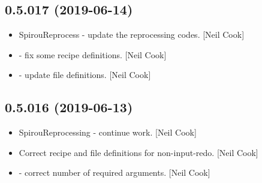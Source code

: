 \documentclass[a4paper,10pt,english]{report}
\begin{document}
\subsection{0.5.017 (2019-06-14)}
\label{\detokenize{misc/changelog:id119}}\begin{itemize}
\item {} 
SpirouReprocess - update the reprocessing codes. {[}Neil Cook{]}

\item {} 
 - fix some recipe definitions. {[}Neil Cook{]}

\item {} 
 - update file definitions. {[}Neil Cook{]}

\end{itemize}


\subsection{0.5.016 (2019-06-13)}
\label{\detokenize{misc/changelog:id120}}\begin{itemize}
\item {} 
SpirouReprocessing - continue work. {[}Neil Cook{]}

\item {} 
Correct recipe and file definitions for non-input-redo. {[}Neil Cook{]}

\item {} 
 - correct number of required arguments. {[}Neil
Cook{]}

\end{itemize}
\end{document}
